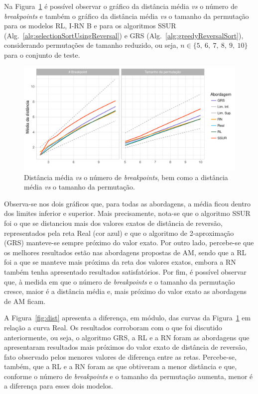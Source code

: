 \documentclass[runningheads,a4paper]{llncs}
\begin{document}
Na Figura~\ref{fig:bp} é possível observar o gráfico da distância média \textit{vs} o número de \textit{breakpoints} e também o gráfico da distância média \textit{vs} o tamanho da permutação para os modelos RL, I-RN B e para os algoritmos SSUR (Alg.~\ref{alg:selectionSortUsingReversal}) e GRS (Alg.~\ref{alg:greedyReversalSort}), considerando permutações de tamanho reduzido, ou seja, $n \in \{5, \ 6, \ 7, \ 8, \ 9, \ 10\}$ para o conjunto de teste. 

\begin{figure}[H]
	\centering
	\includegraphics[scale=0.5]{bp.pdf}
	\caption{Distância média \textit{vs} o número de \textit{breakpoints}, bem como a distância média \textit{vs} o tamanho da permutação.}
	\label{fig:bp}
\end{figure}

Observa-se nos dois gráficos que, para todas as abordagens, a média ficou dentro dos limites inferior e superior. Mais precisamente, nota-se que o algoritmo SSUR foi o que se distanciou mais dos valores exatos de distância de reversão, representados pela reta Real (cor azul) e que o algoritmo de 2-aproximação (GRS) manteve-se sempre próximo do valor exato. Por outro lado, percebe-se que os melhores resultados estão nas abordagens propostas de AM, sendo que a RL foi a que se manteve mais próxima da reta dos valores exatos, embora a RN também tenha apresentado resultados satisfatórios. Por fim, é possível observar que, à medida em que o número de \textit{breakpoints} e o tamanho da permutação cresce, maior é a distância média e, mais próximo do valor exato as abordagens de AM ficam.

A Figura~\ref{fig:dist} apresenta a diferença, em módulo, das curvas da Figura~\ref{fig:bp} em relação a curva Real. Os resultados corroboram com o que foi discutido anteriormente, ou seja, o algoritmo GRS, a RL e a RN foram as abordagens que apresentaram resultados mais próximos do valor exato de distância de reversão, fato observado pelos menores valores de diferença entre as retas. Percebe-se, também, que a RL e a RN foram as que obtiveram a menor distância e que, conforme o número de \textit{breakpoints} e o tamanho da permutação aumenta, menor é a diferença para esses dois modelos.
\end{document}
